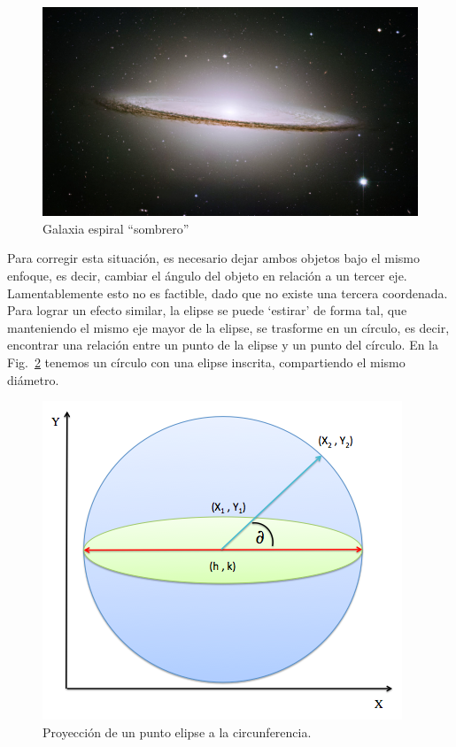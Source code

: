 \begin{figure}[hb!]
  \begin{center}
    \includegraphics[scale=.5]{image/sombrero}
  \end{center}
  \caption{Galaxia espiral ``sombrero''}\label{img:sombrero}
\end{figure}

Para corregir esta situación, es necesario dejar ambos objetos bajo el
mismo enfoque, es decir, cambiar el ángulo del objeto en relación a un
tercer eje. Lamentablemente esto no es factible, dado que no existe
una tercera coordenada. Para lograr un efecto similar, la elipse se
puede ‘estirar’ de forma tal, que manteniendo el mismo eje mayor de la
elipse, se trasforme en un círculo, es decir, encontrar una relación
entre un punto de la elipse y un punto del círculo. En la
Fig.~\ref{img:proyPunto} tenemos un círculo con una elipse inscrita,
compartiendo el mismo diámetro.

\begin{figure}[hb!]
  \begin{center}
    \includegraphics[scale=.5]{image/proyeccion}
  \end{center}
  \caption{Proyección de un punto elipse a la circunferencia.}\label{img:proyPunto}
\end{figure}

